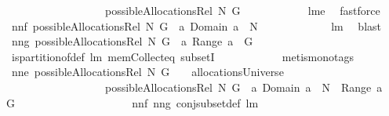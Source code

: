 \begin{isabellebody}
\ \ \ \ \ \ \ \ \ \ \ \ \ \ \ \ \ \ possibleAllocationsRel\ N\ G{\isachardoublequoteclose}\isanewline
%
\isadelimproof
\ \ \ \ \ \ \ \ \ \ %
\endisadelimproof
%
\isatagproof
{}\isamarkupfalse%
\ lm{}{}e\ \isamarkupfalse%
\ fastforce%
\endisatagproof
{\isafoldproof}%
%
\isadelimproof
\isanewline
%
\endisadelimproof
\isanewline
{}\isamarkupfalse%
\ nn{}{}f{\isacharcolon}\ {\isachardoublequoteopen}possibleAllocationsRel\ N\ G\ {\isasymsubseteq}\ {\isacharbraceleft}a{\isachardot}\ {\isacharparenleft}Domain\ a{\isacharparenright}\ {\isasymsubseteq}\ N{\isacharbraceright}{\isachardoublequoteclose}\ \isanewline
%
\isadelimproof
\ \ \ \ \ \ \ \ \ \ %
\endisadelimproof
%
\isatagproof
{}\isamarkupfalse%
\ lm{}{}\ \isamarkupfalse%
\ blast%
\endisatagproof
{\isafoldproof}%
%
\isadelimproof
\isanewline
%
\endisadelimproof
\isanewline
{}\isamarkupfalse%
\ nn{}{}g{\isacharcolon}\ {\isachardoublequoteopen}possibleAllocationsRel\ N\ G\ {\isasymsubseteq}\ {\isacharbraceleft}a{\isachardot}\ {\isacharparenleft}{\isasymUnion}Range\ a{\isacharparenright}\ {\isacharequal}\ G{\isacharbraceright}{\isachardoublequoteclose}\ \isanewline
%
\isadelimproof
\ \ \ \ \ \ \ \ \ \ %
\endisadelimproof
%
\isatagproof
{}\isamarkupfalse%
\ is{\isacharunderscore}partition{\isacharunderscore}of{\isacharunderscore}def\ lm{}{}\ mem{\isacharunderscore}Collect{\isacharunderscore}eq\ subsetI\isanewline
\ \ \ \ \ \ \ \ \ \ \isamarkupfalse%
\ {\isacharparenleft}metis{\isacharparenleft}mono{\isacharunderscore}tags{\isacharparenright}{\isacharparenright}%
\endisatagproof
{\isafoldproof}%
%
\isadelimproof
\isanewline
%
\endisadelimproof
\isanewline
{}\isamarkupfalse%
\ nn{}{}e{\isacharcolon}\ {\isachardoublequoteopen}possibleAllocationsRel\ N\ G\ \ {\isasymsubseteq}\ \ allocationsUniverse\ {\isacharampersand}\isanewline
\ \ \ \ \ \ \ \ \ \ \ \ \ \ \ \ \ \ possibleAllocationsRel\ N\ G\ {\isasymsubseteq}\ {\isacharbraceleft}a{\isachardot}\ {\isacharparenleft}Domain\ a{\isacharparenright}\ {\isasymsubseteq}\ N\ {\isacharampersand}\ {\isacharparenleft}{\isasymUnion}Range\ a{\isacharparenright}\ {\isacharequal}\ G{\isacharbraceright}{\isachardoublequoteclose}\ \isanewline
%
\isadelimproof
\ \ \ \ \ \ \ \ \ \ \ \ \ \ \ \ \ \ %
\endisadelimproof
%
\isatagproof
{}\isamarkupfalse%
\ nn{}{}f\ nn{}{}g\ conj{\isacharunderscore}subset{\isacharunderscore}def\ lm{}{}\ \isamarkupfalse%

\end{isabellebody}
